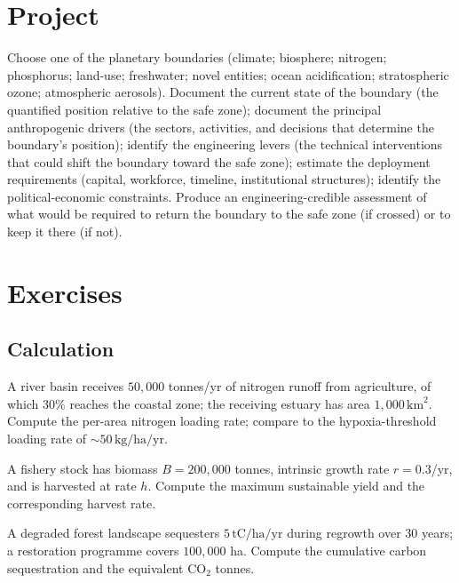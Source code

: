\section{Project}

\begin{project}
Choose one of the planetary boundaries (climate; biosphere; nitrogen; phosphorus; land-use; freshwater; novel entities; ocean acidification; stratospheric ozone; atmospheric aerosols). Document the current state of the boundary (the quantified position relative to the safe zone); document the principal anthropogenic drivers (the sectors, activities, and decisions that determine the boundary's position); identify the engineering levers (the technical interventions that could shift the boundary toward the safe zone); estimate the deployment requirements (capital, workforce, timeline, institutional structures); identify the political-economic constraints. Produce an engineering-credible assessment of what would be required to return the boundary to the safe zone (if crossed) or to keep it there (if not).
\end{project}

\section{Exercises}

\subsection*{Calculation}

\begin{exercise}
A river basin receives $50{,}000$ tonnes/yr of nitrogen runoff from agriculture, of which $30\%$ reaches the coastal zone; the receiving estuary has area $1{,}000\,\text{km}^2$. Compute the per-area nitrogen loading rate; compare to the hypoxia-threshold loading rate of $\sim 50\,\text{kg/ha/yr}$.
\end{exercise}

\begin{exercise}
A fishery stock has biomass $B = 200{,}000$ tonnes, intrinsic growth rate $r = 0.3$/yr, and is harvested at rate $h$. Compute the maximum sustainable yield and the corresponding harvest rate.
\end{exercise}

\begin{exercise}
A degraded forest landscape sequesters $5\,\text{tC/ha/yr}$ during regrowth over $30$ years; a restoration programme covers $100{,}000$ ha. Compute the cumulative carbon sequestration and the equivalent CO$_2$ tonnes.
\end{exercise}

